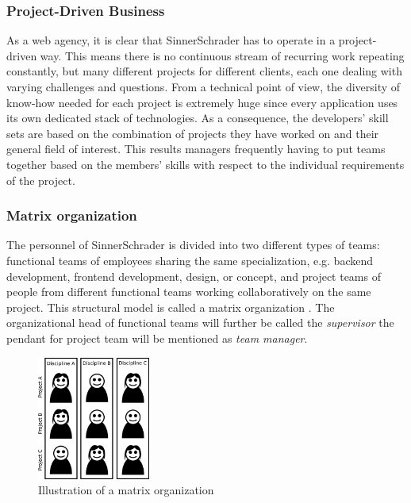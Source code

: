 \subsubsection{Project-Driven Business}
As a web agency, it is clear that SinnerSchrader has to operate in a project-driven way. This means there is no continuous stream of recurring work repeating constantly, but many different projects for different clients, each one dealing with varying challenges and questions. From a technical point of view, the diversity of know-how needed for each project is extremely huge since every application uses its own dedicated stack of technologies. As a consequence, the developers’ skill sets are based on the combination of projects they have worked on and their general field of interest. This results managers frequently having to put teams together based on the members’ skills with respect to the individual requirements of the project.

\subsubsection{Matrix organization}
The personnel of SinnerSchrader is divided into two different types of teams: functional teams of
employees sharing the same specialization, e.g. backend development, frontend development, design, or concept, and project teams of people from different functional teams working collaboratively on the same project. This structural model is called a matrix organization \cite[P. 75]{BWL}.
The organizational head of functional teams will further be called the \textit{supervisor} the pendant for project team will be mentioned as \textit{team manager}.

\begin{figure}[!htp]
    \centering
    \includegraphics[width=0.33\textwidth]{images/matrixorga.png}
    \caption[Diagram: Matrix organization]{Illustration of a matrix organization}
    \label{fig:matrixorga}
\end{figure}

